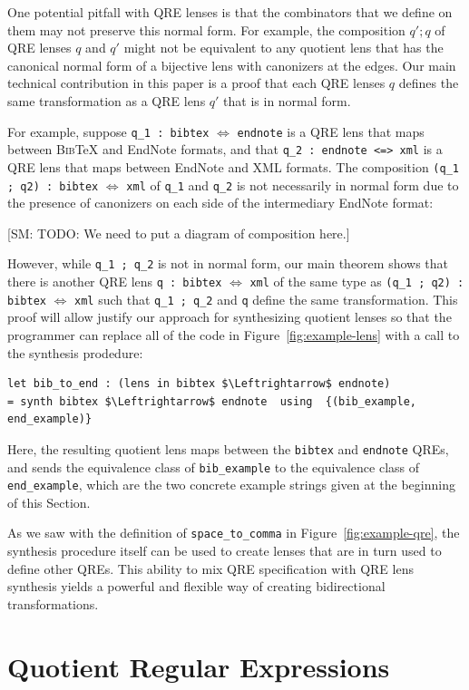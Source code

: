 \documentclass[acmsmall,review,anonymous]{acmart}\settopmatter{printfolios=true,printccs=false,printacmref=false}
\newcommand{\FINISH}[3]{\ifdraft\textcolor{#1}{[#2: #3]}\fi}
\newcommand{\sam}[1]{\FINISH{dkpurple}{SM}{#1}}
\newcommand{\bibtex}{\textsc{Bib}\TeX{}}
\newcommand{\cd}[1]{\lstinline[backgroundcolor=\color{white}]$#1$}
\begin{document}
One potential pitfall with QRE lenses is that the combinators that we define on
them may not preserve this normal form. For example, the composition $q'; q$ of
QRE lenses $q$ and $q'$ might not be equivalent to any quotient lens that has
the canonical normal form of a bijective lens with canonizers at the edges.
Our main technical contribution in this paper is a proof that each QRE lenses
$q$ defines the same transformation as a QRE lens $q'$ that is in normal form.

For example, suppose \cd{q_1 : bibtex} $\Leftrightarrow$ \cd{endnote} is a QRE
lens that maps between \bibtex{} and EndNote formats, and that \cd{q_2 : endnote
<=> xml} is a QRE lens that maps between EndNote and XML formats. The
composition \cd{(q_1 ; q2) : bibtex} $\Leftrightarrow$ \cd{xml} of \cd{q_1} and
\cd{q_2} is not necessarily in normal form due to the presence of canonizers
on each side of the intermediary EndNote format:

\sam{TODO: We need to put a diagram of composition here.}

\noindent However, while \cd{q_1 ; q_2} is not in normal form, our main theorem
shows that there is another QRE lens \cd{q : bibtex} $\Leftrightarrow$ \cd{xml}
of the same type as \cd{(q_1 ; q2) : bibtex} $\Leftrightarrow$ \cd{xml} such
that \cd{q_1 ; q_2} and \cd{q} define the same transformation. This proof
will allow justify our approach for synthesizing quotient lenses so that the
programmer can replace all of the code in Figure~\ref{fig:example-lens} with a
call to the synthesis prodedure:

\begin{lstlisting}
let bib_to_end : (lens in bibtex $\Leftrightarrow$ endnote)
= synth bibtex $\Leftrightarrow$ endnote  using  {(bib_example, end_example)}
\end{lstlisting}
\noindent Here, the resulting  quotient lens maps between the \cd{bibtex} and
\cd{endnote} QREs, and sends the equivalence class of \cd{bib_example} to
the equivalence class of \cd{end_example}, which are the two concrete example
strings given at the beginning of this Section.

As we saw with the definition of \cd{space_to_comma} in
Figure~\ref{fig:example-qre}, the synthesis procedure itself can be used to
create lenses that are in turn used to define other QREs.  This ability to mix
QRE specification with QRE lens synthesis yields a powerful and flexible way of
creating bidirectional transformations.

\section{Quotient Regular Expressions}
\label{QRE}
\end{document}
